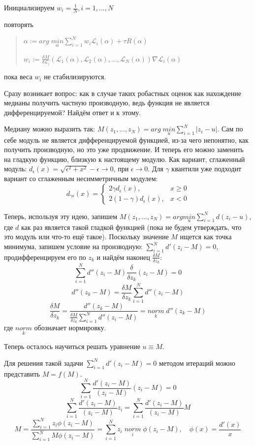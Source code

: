 Инициализируем $w_i = \frac{1}{N}, i = 1,...,N$

повторять
\begin{quote}
    $\alpha := arg \; \underset{\alpha}{min} \sum_{i=1}^N w_i \mathscr{L}_i(\alpha) + \tau R(\alpha)$\
    
    $w_i := \frac{\delta M}{\delta \mathscr{L}_i}(\mathscr{L}_1(\alpha), \mathscr{L}_2(\alpha), ..., \mathscr{L}_N(\alpha)) \nabla \mathscr{L}_i(\alpha)$
\end{quote}

пока веса $w_i$ не стабилизируются.

Сразу возникает вопрос: как в случае таких робастных оценок как нахождение медианы получить частную производную, ведь функция не является дифференцируемой? Найдём ответ и к этому.

Медиану можно выразить так: $M(z_1, ..., z_N) = arg \; \underset{u}{min} \sum_{i=1}^N |z_i - u|$. Сам по себе модуль не является дифференцируемой функцией, из-за чего непонятно, как получить производную, но это уже продвижение. И теперь его можно заменить на гладкую функцию, близкую к настоящему модулю. Как вариант, сглаженный модуль: $d_{\epsilon}(x) = \sqrt{\epsilon ^ 2 + x^ 2} - \epsilon \xrightarrow{} 0$, при $\epsilon \xrightarrow{} 0$.
Для $\gamma$ квантили уже подходит вариант со сглаженным несимметричным модулем:
\[
    d_{\gamma \epsilon}(x)= 
\begin{cases}
    2\gamma d_{\epsilon}(x),& x \geq 0\\
    2(1 - \gamma) d_{\epsilon}(x),& x < 0
\end{cases}
\]

Теперь, используя эту идею, запишем $M(z_1, ..., z_N) =  arg \underset{u}{min} \sum_{i=1}^N d(z_i - u)$, где $d$ как раз является такой гладкой функцией (пока не будем утверждать, что это модуль или что-то ещё такое). Поскольку значение $M$ ищется как точка минимума, запишем условие на производную: $\sum_{i=1}^N d'(z_i - M) = 0$, продифференцируем его по $z_k$ и найдём наконец $\frac{\delta M}{\delta z_k}$:
$$\sum_{i=1}^Nd''(z_i - M) \frac{\delta}{\delta z_k} (z_i - M) = 0$$
$$d''(z_k - M) = \frac{\delta M}{\delta z_k} \sum_{i=1}^Nd''(z_i - M)$$
$$\frac{\delta M}{\delta z_k} = \frac{d''(z_k - M)}{\frac{\delta M}{\delta z_k} \sum_{i=1}^Nd''(z_i - M)} = \underset{k}{norm} \; d''(z_k - M)$$
где $\underset{k}{norm}$ обозначает нормировку.

Теперь осталось научиться решать уравнение $u \equiv M$.

Для решения такой задачи $\sum_{i=1}^Nd'(z_i - M) = 0$ методом итераций можно представить $M = f(M)$.
$$\sum_{i=1}^N \frac{d'(z_i - M)}{(z_i - M)} (z_i - M) = 0$$
$$\sum_{i=1}^N \frac{d'(z_i - M)}{(z_i - M)} z_i = \sum_{i=1}^N \frac{d'(z_i - M)}{(z_i - M)} M$$
$$M = \frac{\sum_{i=1}^N z_i \phi(z_i - M)}{\sum_{i=1}^N M \phi(z_i - M)} = \sum_{i=1}^N z_i \; \underset{i}{norm} \; \phi(z_i - M), \quad \phi(x) = \frac{d'(x)}{x}$$

